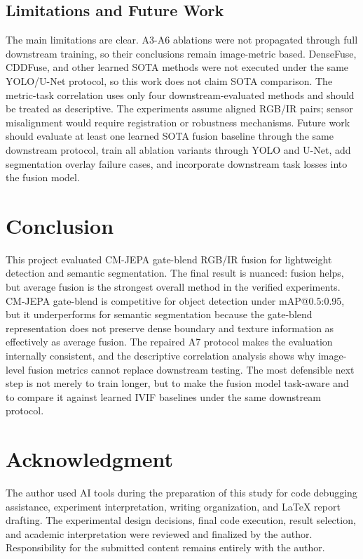 \documentclass[conference,a4paper]{IEEEtran}
\begin{document}
\subsection{Limitations and Future Work}
The main limitations are clear. A3-A6 ablations were not propagated through full downstream training, so their conclusions remain image-metric based. DenseFuse, CDDFuse, and other learned SOTA methods were not executed under the same YOLO/U-Net protocol, so this work does not claim SOTA comparison. The metric-task correlation uses only four downstream-evaluated methods and should be treated as descriptive. The experiments assume aligned RGB/IR pairs; sensor misalignment would require registration or robustness mechanisms. Future work should evaluate at least one learned SOTA fusion baseline through the same downstream protocol, train all ablation variants through YOLO and U-Net, add segmentation overlay failure cases, and incorporate downstream task losses into the fusion model.

\section{Conclusion}
This project evaluated CM-JEPA gate-blend RGB/IR fusion for lightweight detection and semantic segmentation. The final result is nuanced: fusion helps, but average fusion is the strongest overall method in the verified experiments. CM-JEPA gate-blend is competitive for object detection under mAP@0.5:0.95, but it underperforms for semantic segmentation because the gate-blend representation does not preserve dense boundary and texture information as effectively as average fusion. The repaired A7 protocol makes the evaluation internally consistent, and the descriptive correlation analysis shows why image-level fusion metrics cannot replace downstream testing. The most defensible next step is not merely to train longer, but to make the fusion model task-aware and to compare it against learned IVIF baselines under the same downstream protocol.

\section*{Acknowledgment}
The author used AI tools during the preparation of this study for code debugging assistance, experiment interpretation, writing organization, and LaTeX report drafting. The experimental design decisions, final code execution, result selection, and academic interpretation were reviewed and finalized by the author. Responsibility for the submitted content remains entirely with the author.

\balance


\end{document}
